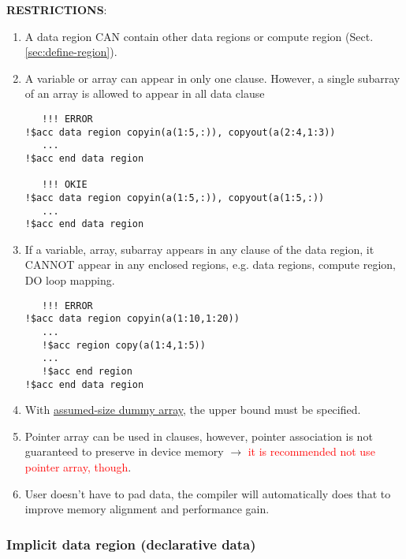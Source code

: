 {\bf RESTRICTIONS}:
\begin{enumerate}
\item A data region CAN contain other data regions or
  compute region (Sect.\ref{sec:define-region}).

\item A variable or array can appear in only one clause. However, a
  single subarray of an array is allowed to appear in all data clause
\begin{lstlisting}
   !!! ERROR
!$acc data region copyin(a(1:5,:)), copyout(a(2:4,1:3))
   ...
!$acc end data region

   !!! OKIE
!$acc data region copyin(a(1:5,:)), copyout(a(1:5,:))
   ...
!$acc end data region
\end{lstlisting}

\item If a variable, array, subarray appears in any clause of the data
  region, it CANNOT appear in any enclosed regions, e.g. data regions,
  compute region, DO loop mapping. 
\begin{lstlisting}
   !!! ERROR
!$acc data region copyin(a(1:10,1:20))
   ...
   !$acc region copy(a(1:4,1:5))
   ...
   !$acc end region
!$acc end data region
\end{lstlisting}

\item With \hyperref[sec:array]{assumed-size dummy array}, the upper
  bound must be specified.

\item Pointer array can be used in clauses, however, pointer
  association is not guaranteed to preserve in device memory
  $\rightarrow$
  \textcolor{red}{it is recommended not use pointer array, though}.

\item User doesn't have to pad data, the compiler will automatically
  does that to improve memory alignment and performance gain.
\end{enumerate}


\subsubsection{Implicit data region (declarative data)}
\label{sec:define-decl-data}

